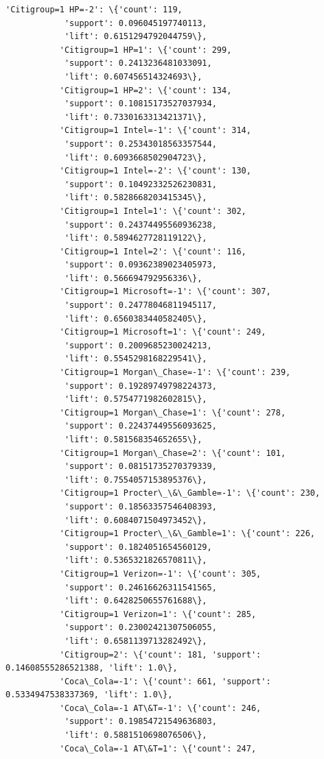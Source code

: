 \documentclass[11pt]{article}
\begin{document}
\begin{Verbatim}[commandchars=\\\{\}]
           'Citigroup=1 HP=-2': \{'count': 119,
            'support': 0.096045197740113,
            'lift': 0.6151294792044759\},
           'Citigroup=1 HP=1': \{'count': 299,
            'support': 0.2413236481033091,
            'lift': 0.607456514324693\},
           'Citigroup=1 HP=2': \{'count': 134,
            'support': 0.10815173527037934,
            'lift': 0.7330163313421371\},
           'Citigroup=1 Intel=-1': \{'count': 314,
            'support': 0.25343018563357544,
            'lift': 0.6093668502904723\},
           'Citigroup=1 Intel=-2': \{'count': 130,
            'support': 0.10492332526230831,
            'lift': 0.5828668203415345\},
           'Citigroup=1 Intel=1': \{'count': 302,
            'support': 0.24374495560936238,
            'lift': 0.5894627728119122\},
           'Citigroup=1 Intel=2': \{'count': 116,
            'support': 0.09362389023405973,
            'lift': 0.566694792956336\},
           'Citigroup=1 Microsoft=-1': \{'count': 307,
            'support': 0.24778046811945117,
            'lift': 0.6560383440582405\},
           'Citigroup=1 Microsoft=1': \{'count': 249,
            'support': 0.2009685230024213,
            'lift': 0.5545298168229541\},
           'Citigroup=1 Morgan\_Chase=-1': \{'count': 239,
            'support': 0.19289749798224373,
            'lift': 0.5754771982602815\},
           'Citigroup=1 Morgan\_Chase=1': \{'count': 278,
            'support': 0.22437449556093625,
            'lift': 0.581568354652655\},
           'Citigroup=1 Morgan\_Chase=2': \{'count': 101,
            'support': 0.08151735270379339,
            'lift': 0.7554057153895376\},
           'Citigroup=1 Procter\_\&\_Gamble=-1': \{'count': 230,
            'support': 0.18563357546408393,
            'lift': 0.6084071504973452\},
           'Citigroup=1 Procter\_\&\_Gamble=1': \{'count': 226,
            'support': 0.1824051654560129,
            'lift': 0.5365321826570811\},
           'Citigroup=1 Verizon=-1': \{'count': 305,
            'support': 0.24616626311541565,
            'lift': 0.6428250655761688\},
           'Citigroup=1 Verizon=1': \{'count': 285,
            'support': 0.23002421307506055,
            'lift': 0.6581139713282492\},
           'Citigroup=2': \{'count': 181, 'support': 0.14608555286521388, 'lift': 1.0\},
           'Coca\_Cola=-1': \{'count': 661, 'support': 0.5334947538337369, 'lift': 1.0\},
           'Coca\_Cola=-1 AT\&T=-1': \{'count': 246,
            'support': 0.19854721549636803,
            'lift': 0.5881510698076506\},
           'Coca\_Cola=-1 AT\&T=1': \{'count': 247,

\end{Verbatim}
\end{document}
